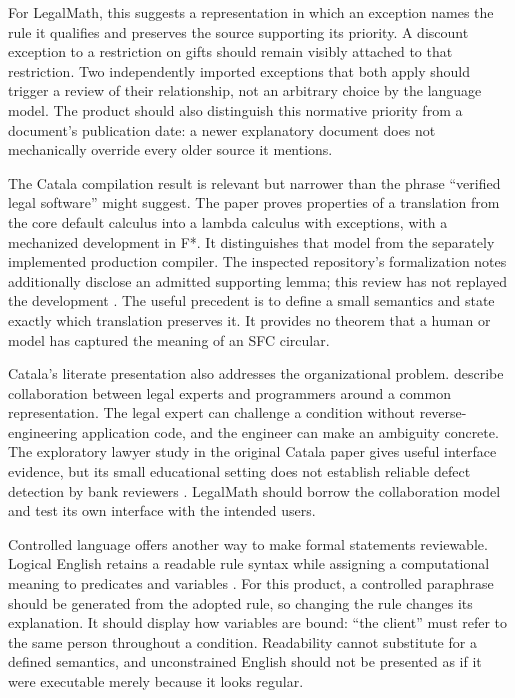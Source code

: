 For LegalMath, this suggests a representation in which an exception names the
rule it qualifies and preserves the source supporting its priority. A discount
exception to a restriction on gifts should remain visibly attached to that
restriction. Two independently imported exceptions that both apply should trigger
a review of their relationship, not an arbitrary choice by the language model.
The product should also distinguish this normative priority from a document's
publication date: a newer explanatory document does not mechanically override
every older source it mentions.

The Catala compilation result is relevant but narrower than the phrase
``verified legal software'' might suggest. The paper proves properties of a
translation from the core default calculus into a lambda calculus with exceptions,
with a mechanized development in F*. It distinguishes that model from the
separately implemented production compiler. The inspected repository's
formalization notes additionally disclose an admitted supporting lemma; this
review has not replayed the development \citep[sec.~4]{catala2021,catalacode}.
The useful precedent is to define a small semantics and state exactly which
translation preserves it. It provides no theorem that a human or model has
captured the meaning of an SFC circular.

Catala's literate presentation also addresses the organizational problem.
\citet[sec.~4.2]{huttner2022} describe collaboration between legal experts and
programmers around a common representation. The legal expert can challenge a
condition without reverse-engineering application code, and the engineer can
make an ambiguity concrete. The exploratory lawyer study in the original Catala
paper gives useful interface evidence, but its small educational setting does
not establish reliable defect detection by bank reviewers
\citep[sec.~6]{catala2021}. LegalMath should borrow the collaboration model and
test its own interface with the intended users.

Controlled language offers another way to make formal statements reviewable.
Logical English retains a readable rule syntax while assigning a computational
meaning to predicates and variables \citep{logicalenglish2023}. For this product,
a controlled paraphrase should be generated from the adopted rule, so changing
the rule changes its explanation. It should display how variables are bound:
``the client'' must refer to the same person throughout a condition. Readability
cannot substitute for a defined semantics, and unconstrained English should not
be presented as if it were executable merely because it looks regular.

